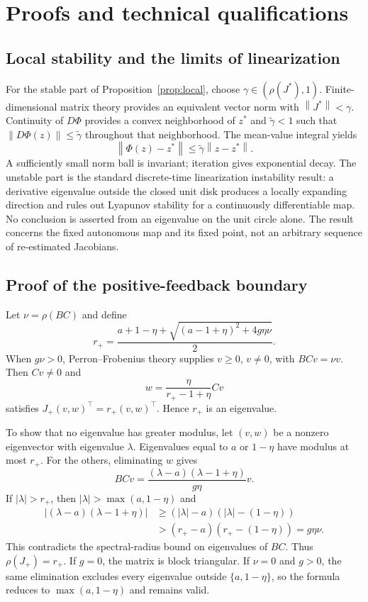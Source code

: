 \documentclass[11pt,a4paper]{article}
\theoremstyle{definition}
\theoremstyle{remark}
\newcommand{\norm}[1]{\left\lVert #1\right\rVert}
\begin{document}
\clearpage
\appendix
\section{Proofs and technical qualifications}
\label{app:proofs}
\subsection{Local stability and the limits of linearization}
For the stable part of Proposition~\ref{prop:local}, choose $\gamma\in(\rho(J^*),1)$. Finite-dimensional matrix theory provides an equivalent vector norm with $\norm{J^*}<\gamma$. Continuity of $D\Phi$ provides a convex neighborhood of $z^*$ and $\widetilde\gamma<1$ such that $\norm{D\Phi(z)}\leq\widetilde\gamma$ throughout that neighborhood. The mean-value integral yields
\begin{equation}
 \norm{\Phi(z)-z^*}\leq\widetilde\gamma\norm{z-z^*}.
\end{equation}
A sufficiently small norm ball is invariant; iteration gives exponential decay. The unstable part is the standard discrete-time linearization instability result: a derivative eigenvalue outside the closed unit disk produces a locally expanding direction and rules out Lyapunov stability for a continuously differentiable map. No conclusion is asserted from an eigenvalue on the unit circle alone. The result concerns the fixed autonomous map and its fixed point, not an arbitrary sequence of re-estimated Jacobians.

\subsection{Proof of the positive-feedback boundary}
\label{app:positiveproof}
Let $\nu=\rho(BC)$ and define
\begin{equation}
 r_+=\frac{a+1-\eta+\sqrt{(a-1+\eta)^2+4g\eta\nu}}{2}.
\end{equation}
When $g\nu>0$, Perron--Frobenius theory supplies $v\geq0$, $v\ne0$, with $BCv=\nu v$. Then $Cv\ne0$ and
\begin{equation}
 w=\frac{\eta}{r_+-1+\eta}Cv
\end{equation}
satisfies $J_+(v,w)^\top=r_+(v,w)^\top$. Hence $r_+$ is an eigenvalue.

To show that no eigenvalue has greater modulus, let $(v,w)$ be a nonzero eigenvector with eigenvalue $\lambda$. Eigenvalues equal to $a$ or $1-\eta$ have modulus at most $r_+$. For the others, eliminating $w$ gives
\begin{equation}
 BCv=\frac{(\lambda-a)(\lambda-1+\eta)}{g\eta}v.
\end{equation}
If $|\lambda|>r_+$, then $|\lambda|>\max(a,1-\eta)$ and
\begin{align}
 |(\lambda-a)(\lambda-1+\eta)|
 &\geq(|\lambda|-a)(|\lambda|-(1-\eta))\\
 &>(r_+-a)(r_+-(1-\eta))=g\eta\nu.
\end{align}
This contradicts the spectral-radius bound on eigenvalues of $BC$. Thus $\rho(J_+)=r_+$. If $g=0$, the matrix is block triangular. If $\nu=0$ and $g>0$, the same elimination excludes every eigenvalue outside $\{a,1-\eta\}$, so the formula reduces to $\max(a,1-\eta)$ and remains valid.
\end{document}
